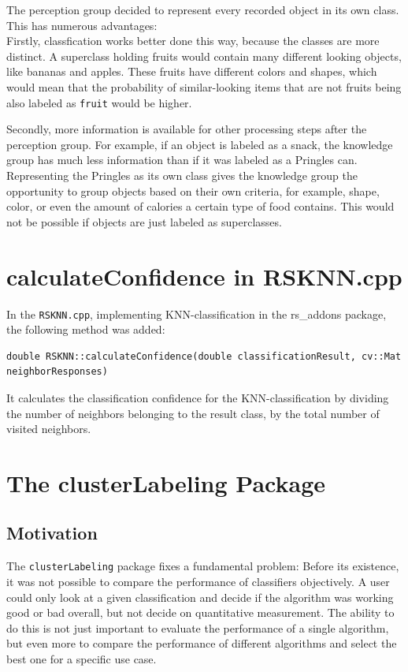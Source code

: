 \documentclass[main.tex]{subfiles}
\begin{document}
The perception group decided to represent every recorded object in its own class. This has numerous advantages:\\

Firstly, classfication works better done this way, because the classes are more distinct. A superclass holding fruits would contain many different looking objects, like bananas and apples. These fruits have different colors and shapes, which would mean that the probability of similar-looking items that are not fruits being also labeled as \texttt{fruit} would be higher.

Secondly, more information is available for other processing steps after the perception group. For example, if an object is labeled as a snack, the knowledge group has much less information than if it was labeled as a Pringles can. Representing the Pringles as its own class gives the knowledge group the opportunity to group objects based on their own criteria, for example, shape, color, or even the amount of calories a certain type of food contains. This would not be possible if objects are just labeled as superclasses.
 



\section{calculateConfidence in RSKNN.cpp}\label{KNN confidence}
In the \texttt{RSKNN.cpp}, implementing KNN-classification in the rs\_addons package, the following method was added:

\begin{lstlisting}
double RSKNN::calculateConfidence(double classificationResult, cv::Mat neighborResponses)
\end{lstlisting}

It calculates the classification confidence for the KNN-classification by dividing the number of neighbors belonging to the result class, by the total number of visited neighbors. 

\section{The clusterLabeling Package}\label{clusterLabeling}
\subsection{Motivation}
The \texttt{clusterLabeling} package fixes a fundamental problem: Before its existence, it was not possible to compare the performance of classifiers objectively. A user could only look at a given classification and decide if the algorithm was working good or bad overall, but not decide on quantitative measurement. The ability to do this is not just important to evaluate the performance of a single algorithm, but even more to compare the performance of different algorithms and select the best one for a specific use case.\\
\end{document}

